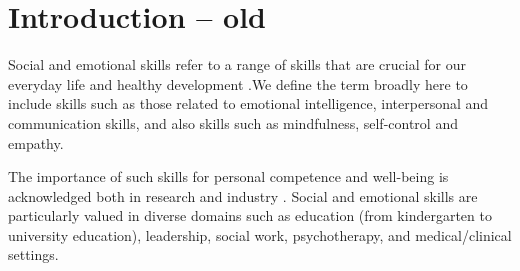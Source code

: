 \documentclass[prodmode,acmtochi]{acmsmall}
\newcommand{\todo}[1]{\textrm{\textrm{\textcolor{LightBlue}{[[#1]]}}}}
\begin{document}


\iffalse
\section{Introduction -- old}
 
 Social and emotional skills refer to a range of skills that are crucial for our everyday life and healthy development \cite{Weare2011,Adi2007a,Damon2006}.We define the term broadly here to include skills such as those related to emotional intelligence, interpersonal and communication skills, and also skills such as mindfulness, self-control and empathy. 

The importance of such skills for personal competence and well-being is acknowledged both in research and industry \cite{Durlak2011,Greenberg2010,Stepien2006,Barth2011,Carey2011,Bono2009}. Social and emotional skills are particularly valued in diverse domains such as education (from kindergarten to university education), leadership, social work, psychotherapy, and medical/clinical settings. 

\end{document}
